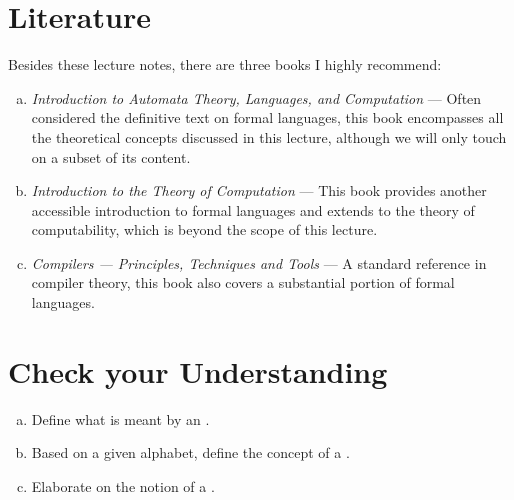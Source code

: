 \section{Literature}
Besides these lecture notes, there are three books I highly recommend:
\begin{enumerate}[(a)]
\item \emph{Introduction to Automata Theory, Languages, and Computation} \cite{hopcroft:06}
      --- Often considered   the definitive text on formal languages, this book encompasses all the theoretical
      concepts discussed in this lecture, although we will only touch on a subset of its content. 
\item \emph{Introduction to the Theory of Computation} \cite{sipser:2012}
      --- This book provides another accessible introduction to formal languages and extends to the theory of
      computability, which is beyond the scope of this lecture. 
\item \emph{Compilers --- Principles, Techniques and Tools} \cite{aho:2006}
      --- A standard reference in compiler theory, this book also covers a substantial portion of formal languages.
\end{enumerate}

\section{Check your Understanding}
\begin{enumerate}[(a)]
\item Define what is meant by an .
\item Based on a given alphabet, define the concept of a .
\item Elaborate on the notion of a .
\end{enumerate}


